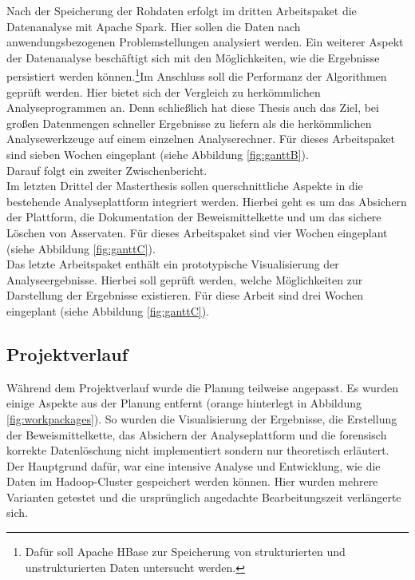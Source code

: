 \noindent
Nach der Speicherung der Rohdaten erfolgt im dritten Arbeitspaket die Datenanalyse mit Apache Spark. Hier sollen die Daten nach anwendungsbezogenen Problemstellungen analysiert werden. Ein weiterer Aspekt der Datenanalyse beschäftigt sich mit den Möglichkeiten, wie die Ergebnisse persistiert werden können.\footnote{Dafür soll Apache HBase zur Speicherung von strukturierten und unstrukturierten Daten untersucht werden.}Im Anschluss soll die Performanz der Algorithmen geprüft werden. Hier bietet sich der Vergleich zu herkömmlichen Analyseprogrammen an. Denn schließlich hat diese Thesis auch das Ziel, bei großen Datenmengen schneller Ergebnisse zu liefern als die herkömmlichen Analysewerkzeuge auf einem einzelnen Analyserechner. Für dieses Arbeitspaket sind sieben Wochen eingeplant (siehe Abbildung \ref{fig:ganttB}).\\
 Darauf folgt ein zweiter Zwischenbericht.\\

\noindent
Im letzten Drittel der Masterthesis sollen querschnittliche Aspekte in die bestehende Analyseplattform integriert werden. Hierbei geht es um das Absichern der Plattform, die Dokumentation der Beweismittelkette und um das sichere Löschen von Asservaten. Für dieses Arbeitspaket sind vier Wochen eingeplant (siehe Abbildung \ref{fig:ganttC}).\\

\noindent
Das letzte Arbeitspaket enthält ein prototypische Visualisierung der Analyseergebnisse. Hierbei soll geprüft werden, welche Möglichkeiten zur Darstellung der Ergebnisse existieren. Für diese Arbeit sind drei Wochen eingeplant (siehe Abbildung \ref{fig:ganttC}).\\

\subsection*{Projektverlauf}
Während dem Projektverlauf wurde die Planung teilweise angepasst. Es wurden einige Aspekte aus der Planung entfernt (orange hinterlegt in Abbildung \ref{fig:workpackages}). So wurden die Visualisierung der Ergebnisse, die Erstellung der Beweismittelkette, das Absichern der Analyseplattform und die forensisch korrekte Datenlöschung nicht implementiert sondern nur theoretisch erläutert. Der Hauptgrund dafür, war eine intensive Analyse und Entwicklung, wie die Daten im Hadoop-Cluster gespeichert werden können. Hier wurden mehrere Varianten getestet und die ursprünglich angedachte Bearbeitungszeit verlängerte sich.\\

